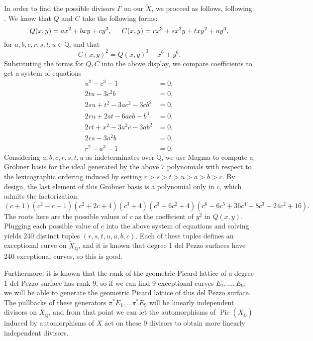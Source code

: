 \documentclass[12pt,twoside]{reedthesis}
\theoremstyle{plain}
\theoremstyle{definition}
\theoremstyle{remark}
\newcommand{\QQ}{\mathbb{Q}}
\newcommand{\Pic}{\operatorname{Pic}}
\begin{document}
In order to find the possible divisors $\Gamma$ on our $\widetilde{X}$, we proceed as follows, following \cite{tonyThesis}. We know that $Q$ and $C$ take the following forms:
\[
Q(x,y)=ax^2+bxy+cy^2,\hspace{0.5cm} C(x,y)=rx^3+sx^2y+txy^2+uy^3,
\]
for $a,b,c,r,s,t,u\in\QQ$, and that
\[
C(x,y)^2=Q(x,y)^3+x^6+y^6.
\]
Substituting the forms for $Q,C$ into the above display, we compare coefficients to get a system of equations
\begin{align*}
u^2-c^3-1&=0,\\
2tu-3c^2b&=0,\\
2su+t^2-3ac^2-3cb^2&=0,\\
2ru+2st-6acb-b^3&=0,\\
2rt+x^2-3a^2c-3ab^2&=0,\\
2rs-3a^2b&=0,\\
r^2-a^3-1&=0.
\end{align*}
Considering $a,b,c,r,s,t,u$ as indeterminates over $\QQ$, we use Magma to compute a Gr\"obner basis for the ideal generated by the above 7 polynomials with respect to the lexicographic ordering induced by setting $r>s>t>u>a>b>c$. By design, the last element of this Gr\"obner basis is a polynomial only in $c$, which admits the factorization:
\[
(c+1)(c^2-c+1)(c^2+2c+4)(c^3+4)(c^3+6c^2+4)(c^6-6c^5+36c^4+8c^3-24c^2+16).
\]
The roots here are the possible values of $c$ as the coefficient of $y^2$ in $Q(x,y)$. Plugging each possible value of $c$ into the above system of equations and solving yields 240 distinct tuples $(r,s,t,u,a,b,c)$. Each of these tuples defines an exceptional curve on $\widetilde{X}_{\overline{\QQ}}$, and it is known that degree 1 del Pezzo surfaces have 240 exceptional curves, so this is good. 

Furthermore, it is known that the rank of the geometric Picard lattice of a degree 1 del Pezzo surface has rank 9, so if we can find 9 exceptional curves $E_1,\ldots, E_9$, we will be able to generate the geometric Picard lattice of this del Pezzo surface. The pullbacks of these generators $\pi^*E_1,\ldots\pi^*E_9$ will be linearly independent divisors on $X_{\overline{\QQ}}$, and from that point we can let the automorphisms of $\Pic(X_{\overline{\QQ}})$ induced by automorphisms of $X$ act on these 9 divisors to obtain more linearly independent divisors.
\backmatter 



\end{document}
